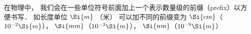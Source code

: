 
在物理中， 我们会在一些单位符号前面加上一个表示数量级的前缀（prefix）以方便书写． 如长度单位 $\Si{m}$ （米） 可以加不同的前缀变为 $\Si{cm}$（$10^{-2}\Si{m}$）， $\Si{mm}$（$10^{-3}\Si{m}$）， $\Si{nm}$（$10^{-9}\Si{m}$） 
